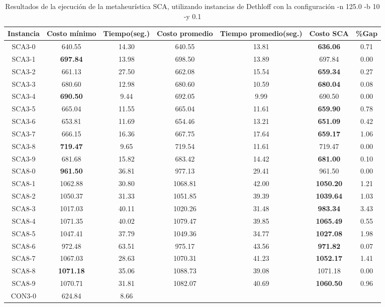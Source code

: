 \begin{table}[ht]
\caption{Resultados de la ejecución de la metaheurística SCA, utilizando instancias de Dethloff con la configuración -n 125.0 -b 10 -y 0.1}
\centering
\small
\begin{tabular}{c c c c c c c}
\hline\hline
Instancia & Costo mínimo & Tiempo(seg.) & Costo promedio & Tiempo promedio(seg.) & Costo SCA & \%Gap \\ [0.5ex]
\hline
SCA3-0 & 640.55 & 14.30 & 
640.55 & 13.81 & \bf{636.06} & 
0.71\\SCA3-1 & \bf{697.84} & 13.98 & 
698.50 & 13.89 & 697.84 & 0.00\\
SCA3-2 & 661.13 & 27.50 & 
662.08 & 15.54 & \bf{659.34} & 
0.27\\SCA3-3 & 680.60 & 12.98 & 
680.60 & 10.59 & \bf{680.04} & 
0.08\\SCA3-4 & \bf{690.50} & 9.44 & 
692.05 & 9.99 & 690.50 & 0.00\\
SCA3-5 & 665.04 & 11.55 & 
665.04 & 11.61 & \bf{659.90} & 
0.78\\SCA3-6 & 653.81 & 11.69 & 
654.46 & 13.21 & \bf{651.09} & 
0.42\\SCA3-7 & 666.15 & 16.36 & 
667.75 & 17.64 & \bf{659.17} & 
1.06\\SCA3-8 & \bf{719.47} & 9.65 & 
719.54 & 11.61 & 719.47 & 0.00\\
SCA3-9 & 681.68 & 15.82 & 
683.42 & 14.42 & \bf{681.00} & 
0.10\\SCA8-0 & \bf{961.50} & 36.81 & 
977.13 & 29.41 & 961.50 & 0.00\\
SCA8-1 & 1062.88 & 30.80 & 
1068.81 & 42.00 & \bf{1050.20} & 
1.21\\SCA8-2 & 1050.37 & 31.33 & 
1051.85 & 39.39 & \bf{1039.64} & 
1.03\\SCA8-3 & 1017.03 & 40.11 & 
1020.26 & 31.48 & \bf{983.34} & 
3.43\\SCA8-4 & 1071.35 & 40.02 & 
1079.47 & 39.85 & \bf{1065.49} & 
0.55\\SCA8-5 & 1047.41 & 37.79 & 
1049.36 & 34.77 & \bf{1027.08} & 
1.98\\SCA8-6 & 972.48 & 63.51 & 
975.17 & 43.56 & \bf{971.82} & 
0.07\\SCA8-7 & 1067.03 & 28.63 & 
1070.31 & 41.23 & \bf{1052.17} & 
1.41\\SCA8-8 & \bf{1071.18} & 35.06 & 
1088.73 & 39.08 & 1071.18 & 0.00\\
SCA8-9 & 1070.71 & 31.81 & 
1082.07 & 40.69 & \bf{1060.50} & 
0.96\\CON3-0 & 624.84 & 8.66 & 

\end{tabular}
\end{table}

